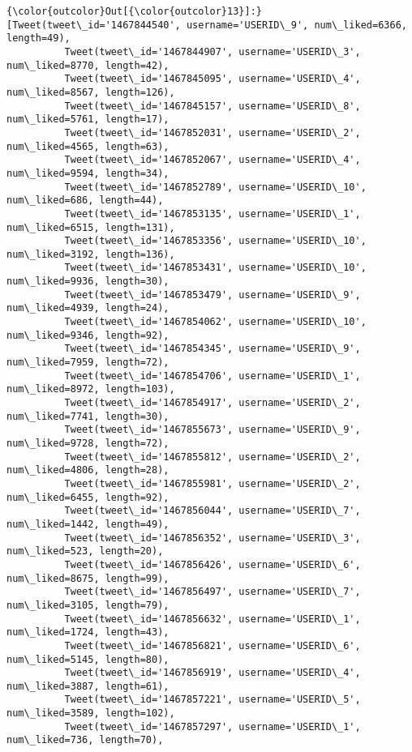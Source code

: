 \documentclass[11pt]{article}
\begin{document}
\begin{Verbatim}[commandchars=\\\{\}]
{\color{outcolor}Out[{\color{outcolor}13}]:} [Tweet(tweet\_id='1467844540', username='USERID\_9', num\_liked=6366, length=49),
          Tweet(tweet\_id='1467844907', username='USERID\_3', num\_liked=8770, length=42),
          Tweet(tweet\_id='1467845095', username='USERID\_4', num\_liked=8567, length=126),
          Tweet(tweet\_id='1467845157', username='USERID\_8', num\_liked=5761, length=17),
          Tweet(tweet\_id='1467852031', username='USERID\_2', num\_liked=4565, length=63),
          Tweet(tweet\_id='1467852067', username='USERID\_4', num\_liked=9594, length=34),
          Tweet(tweet\_id='1467852789', username='USERID\_10', num\_liked=686, length=44),
          Tweet(tweet\_id='1467853135', username='USERID\_1', num\_liked=6515, length=131),
          Tweet(tweet\_id='1467853356', username='USERID\_10', num\_liked=3192, length=136),
          Tweet(tweet\_id='1467853431', username='USERID\_10', num\_liked=9936, length=30),
          Tweet(tweet\_id='1467853479', username='USERID\_9', num\_liked=4939, length=24),
          Tweet(tweet\_id='1467854062', username='USERID\_10', num\_liked=9346, length=92),
          Tweet(tweet\_id='1467854345', username='USERID\_9', num\_liked=7959, length=72),
          Tweet(tweet\_id='1467854706', username='USERID\_1', num\_liked=8972, length=103),
          Tweet(tweet\_id='1467854917', username='USERID\_2', num\_liked=7741, length=30),
          Tweet(tweet\_id='1467855673', username='USERID\_9', num\_liked=9728, length=72),
          Tweet(tweet\_id='1467855812', username='USERID\_2', num\_liked=4806, length=28),
          Tweet(tweet\_id='1467855981', username='USERID\_2', num\_liked=6455, length=92),
          Tweet(tweet\_id='1467856044', username='USERID\_7', num\_liked=1442, length=49),
          Tweet(tweet\_id='1467856352', username='USERID\_3', num\_liked=523, length=20),
          Tweet(tweet\_id='1467856426', username='USERID\_6', num\_liked=8675, length=99),
          Tweet(tweet\_id='1467856497', username='USERID\_7', num\_liked=3105, length=79),
          Tweet(tweet\_id='1467856632', username='USERID\_1', num\_liked=1724, length=43),
          Tweet(tweet\_id='1467856821', username='USERID\_6', num\_liked=5145, length=80),
          Tweet(tweet\_id='1467856919', username='USERID\_4', num\_liked=3887, length=61),
          Tweet(tweet\_id='1467857221', username='USERID\_5', num\_liked=3589, length=102),
          Tweet(tweet\_id='1467857297', username='USERID\_1', num\_liked=736, length=70),

\end{Verbatim}
\end{document}
